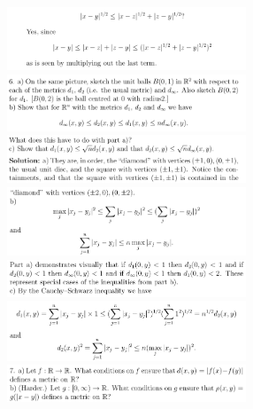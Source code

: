 \documentclass[8pt,landscape]{article}
\begin{document}
\begin{multicols}{3}
    \includegraphics[width=270]{065.png} \\
    \includegraphics[width=270]{066.png} \\
    \includegraphics[width=270]{067.png} \\
    \includegraphics[width=270]{068.png} \\
    \includegraphics[width=270]{069.png} \\
    \includegraphics[width=270]{070.png} \\
    \includegraphics[width=270]{071.png} \\

\end{multicols}
\end{document}
